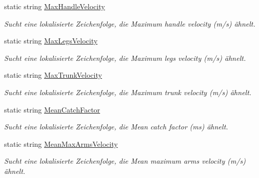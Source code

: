 \begin{DoxyCompactItemize}
static string \hyperlink{class_rowing_monitor_1_1_properties_1_1_resources_ae64ee05cc7efe5061d819604243cc329}{Max\+Handle\+Velocity}
\begin{DoxyCompactList}\small\item\em Sucht eine lokalisierte Zeichenfolge, die Maximum handle velocity (m/s) ähnelt. \end{DoxyCompactList}\item 
static string \hyperlink{class_rowing_monitor_1_1_properties_1_1_resources_a1be32a40d9aabe3ccd2a5e2a4c13c5e6}{Max\+Legs\+Velocity}
\begin{DoxyCompactList}\small\item\em Sucht eine lokalisierte Zeichenfolge, die Maximum legs velocity (m/s) ähnelt. \end{DoxyCompactList}\item 
static string \hyperlink{class_rowing_monitor_1_1_properties_1_1_resources_a55adc5e7b70ad437f1d5cc217fd3e799}{Max\+Trunk\+Velocity}
\begin{DoxyCompactList}\small\item\em Sucht eine lokalisierte Zeichenfolge, die Maximum trunk velocity (m/s) ähnelt. \end{DoxyCompactList}\item 
static string \hyperlink{class_rowing_monitor_1_1_properties_1_1_resources_afd9d96b64031744615932ca371e64257}{Mean\+Catch\+Factor}
\begin{DoxyCompactList}\small\item\em Sucht eine lokalisierte Zeichenfolge, die Mean catch factor (ms) ähnelt. \end{DoxyCompactList}\item 
static string \hyperlink{class_rowing_monitor_1_1_properties_1_1_resources_aefe138efd7d84e783a37820fd4655069}{Mean\+Max\+Arms\+Velocity}
\begin{DoxyCompactList}\small\item\em Sucht eine lokalisierte Zeichenfolge, die Mean maximum arms velocity (m/s) ähnelt. \end{DoxyCompactList}\item 

\end{DoxyCompactItemize}
